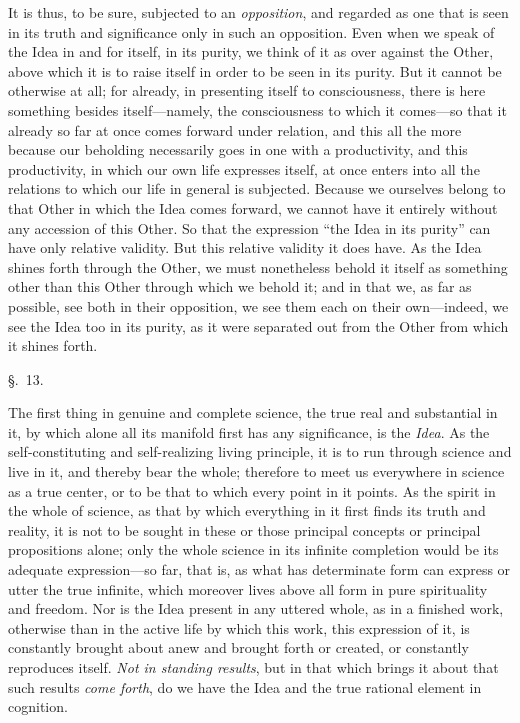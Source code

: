 \documentclass[12pt,a4paper]{book}
\begin{document}
It is thus, to be sure, subjected to an \emph{opposition}, and regarded as one that is
seen in its truth and significance only in such an opposition. Even when we speak of
the Idea in and for itself, in its purity, we think of it as over against the Other,
above which it is to raise itself in order to be seen in its purity. But it cannot be
otherwise at all; for already, in presenting itself to consciousness, there is here
something besides itself---namely, the consciousness to which it comes---so that it
already so far at once comes forward under relation, and this all the more because our
beholding necessarily goes in one with a productivity, and this productivity, in which
our own life expresses itself, at once enters into all the relations to which our life
in general is subjected. Because we ourselves belong to that Other in which the Idea
comes forward, we cannot have it entirely without any accession of this Other. So that
the expression ``the Idea in its purity'' can have only relative validity. But this
relative validity it does have. As the Idea shines forth through the Other, we must
nonetheless behold it itself as something other than this Other through which we behold
it; and in that we, as far as possible, see both in their opposition, we see them each
on their own---indeed, we see the Idea too in its purity, as it were separated out from
the Other from which it shines forth.

\begin{center}\large\S.~13.\end{center}
The first thing in genuine and complete science, the true real and substantial in it,
by which alone all its manifold first has any significance, is the \emph{Idea}. As the
self-constituting and self-realizing living principle, it is to run through science and
live in it, and thereby bear the whole; therefore to meet us everywhere in science as a
true center, or to be that to which every point in it points. As the spirit in the
whole of science, as that by which everything in it first finds its truth and reality,
it is not to be sought in these or those principal concepts or principal propositions
alone; only the whole science in its infinite completion would be its adequate
expression---so far, that is, as what has determinate form can express or utter the
true infinite, which moreover lives above all form in pure spirituality and freedom.
Nor is the Idea present in any uttered whole, as in a finished work, otherwise than in
the active life by which this work, this expression of it, is constantly brought about
anew and brought forth or created, or constantly reproduces itself. \emph{Not in
standing results}, but in that which brings it about that such results \emph{come
forth}, do we have the Idea and the true rational element in cognition.
\end{document}
